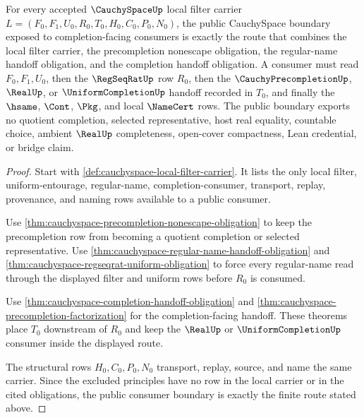 \begin{theorem}
\label{thm:cauchyspace-public-consumer-boundary}
For every accepted $\CauchySpaceUp$ local filter carrier $L=(F_0,F_1,U_0,R_0,T_0,H_0,C_0,P_0,N_0)$, the public CauchySpace boundary exposed to completion-facing consumers is exactly the route that combines the local filter carrier, the precompletion nonescape obligation, the regular-name handoff obligation, and the completion handoff obligation. A consumer must read $F_0,F_1,U_0$, then the $\RegSeqRatUp$ row $R_0$, then the $\CauchyPrecompletionUp$, $\RealUp$, or $\UniformCompletionUp$ handoff recorded in $T_0$, and finally the $\hsame$, $\Cont$, $\Pkg$, and local $\NameCert$ rows. The public boundary exports no quotient completion, selected representative, host real equality, countable choice, ambient $\RealUp$ completeness, open-cover compactness, Lean credential, or bridge claim.
\end{theorem}
\begin{proof}
Start with \autoref{def:cauchyspace-local-filter-carrier}. It lists the only local filter, uniform-entourage, regular-name, completion-consumer, transport, replay, provenance, and naming rows available to a public consumer.

Use \autoref{thm:cauchyspace-precompletion-nonescape-obligation} to keep the precompletion row from becoming a quotient completion or selected representative. Use \autoref{thm:cauchyspace-regular-name-handoff-obligation} and \autoref{thm:cauchyspace-regseqrat-uniform-obligation} to force every regular-name read through the displayed filter and uniform rows before $R_0$ is consumed.

Use \autoref{thm:cauchyspace-completion-handoff-obligation} and \autoref{thm:cauchyspace-precompletion-factorization} for the completion-facing handoff. These theorems place $T_0$ downstream of $R_0$ and keep the $\RealUp$ or $\UniformCompletionUp$ consumer inside the displayed route.

The structural rows $H_0,C_0,P_0,N_0$ transport, replay, source, and name the same carrier. Since the excluded principles have no row in the local carrier or in the cited obligations, the public consumer boundary is exactly the finite route stated above.
\end{proof}

